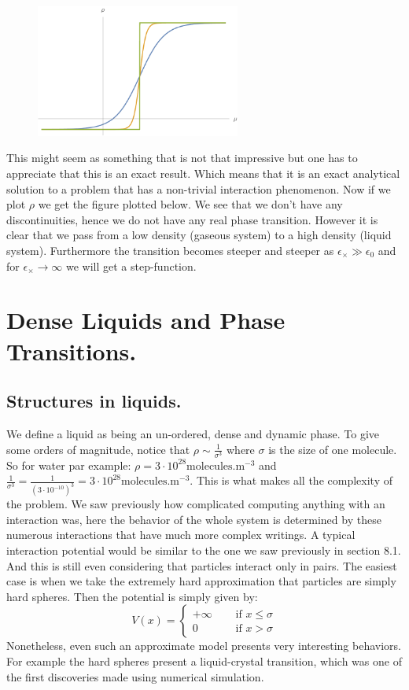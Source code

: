 \documentclass[10pt,a4paper]{book}
\begin{document}
\begin{figure}[h!]
\centering
\includegraphics[width=0.6\textwidth]{graphs/CappillaryTransition}
\end{figure}
This might seem as something that is not that impressive but one has to appreciate that this is an exact result. Which means that it is an exact analytical solution to a problem that has a non-trivial interaction phenomenon. Now if we plot $\rho$ we get the figure plotted below. We see that we don't have any discontinuities, hence we do not have any real phase transition. However it is clear that we pass from a low density (gaseous system) to a high density (liquid system). Furthermore the transition becomes steeper and steeper as $\epsilon_\times \gg \epsilon_0$ and for $\epsilon_\times \to \infty$ we will get a step-function. \vspace{10cm}

\section{Dense Liquids and Phase Transitions.}
\subsection{Structures in liquids.}
We define a liquid as being an un-ordered, dense and dynamic phase. To give some orders of magnitude, notice that $\rho \sim \frac{1}{\sigma^3}$ where $\sigma$ is the size of one molecule. So for water par example: $\rho = 3 \cdot 10^{28} \text{molecules}.\text{m}^{-3}$ and $\frac{1}{\sigma^3} = \frac{1}{(3 \cdot 10^{-10})^3} = 3 \cdot 10^{28} \text{molecules}.\text{m}^{-3}$. This is what makes all the complexity of the problem. We saw previously how complicated computing anything with an interaction was, here the behavior of the whole system is determined by these numerous interactions that have much more complex writings. A typical interaction potential would be similar to the one we saw previously in section 8.1. And this is still even considering that particles interact only in pairs.  The easiest case is when we take the extremely hard approximation that particles are simply hard spheres. Then the potential is simply given by:
\[
V(x) = \begin{cases}
+ \infty \quad &\text{ if } x \leq \sigma\\
0 \quad &\text{ if } x > \sigma
\end{cases}
\]
Nonetheless, even such an approximate model presents very interesting behaviors. For example the hard spheres present a liquid-crystal transition, which was one of the first discoveries made using numerical simulation.
\end{document}
